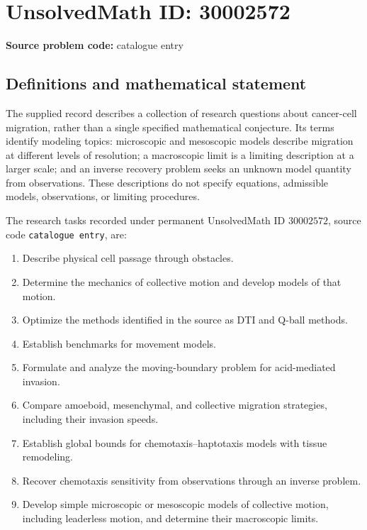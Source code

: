 \documentclass[11pt]{article}
\begin{document}
\section*{UnsolvedMath ID: 30002572}
\textbf{Source problem code:} catalogue entry
\subsection{Definitions and mathematical statement}
The supplied record describes a collection of research questions about cancer-cell migration, rather than a single specified mathematical conjecture. Its terms identify modeling topics: microscopic and mesoscopic models describe migration at different levels of resolution; a macroscopic limit is a limiting description at a larger scale; and an inverse recovery problem seeks an unknown model quantity from observations. These descriptions do not specify equations, admissible models, observations, or limiting procedures.

The research tasks recorded under permanent UnsolvedMath ID \(30002572\), source code \texttt{catalogue entry}, are:
\begin{enumerate}
\item Describe physical cell passage through obstacles.
\item Determine the mechanics of collective motion and develop models of that motion.
\item Optimize the methods identified in the source as DTI and Q-ball methods.
\item Establish benchmarks for movement models.
\item Formulate and analyze the moving-boundary problem for acid-mediated invasion.
\item Compare amoeboid, mesenchymal, and collective migration strategies, including their invasion speeds.
\item Establish global bounds for chemotaxis--haptotaxis models with tissue remodeling.
\item Recover chemotaxis sensitivity from observations through an inverse problem.
\item Develop simple microscopic or mesoscopic models of collective motion, including leaderless motion, and determine their macroscopic limits.
\end{enumerate}
\end{document}

